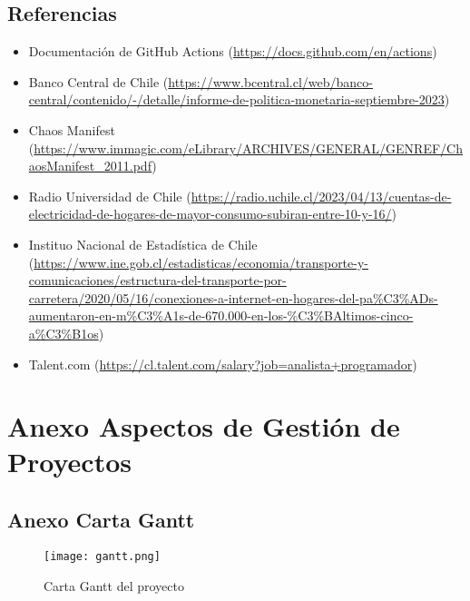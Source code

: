 \subsection{Referencias}
\begin{itemize}
  \item Documentación de GitHub Actions (\url{https://docs.github.com/en/actions})
  \item Banco Central de Chile (\url{https://www.bcentral.cl/web/banco-central/contenido/-/detalle/informe-de-politica-monetaria-septiembre-2023})
  \item Chaos Manifest (\url{https://www.immagic.com/eLibrary/ARCHIVES/GENERAL/GENREF/ChaosManifest\_2011.pdf})
  \item Radio Universidad de Chile (\url{https://radio.uchile.cl/2023/04/13/cuentas-de-electricidad-de-hogares-de-mayor-consumo-subiran-entre-10-y-16/})
  \item Instituo Nacional de Estadística de Chile (\url{https://www.ine.gob.cl/estadisticas/economia/transporte-y-comunicaciones/estructura-del-transporte-por-carretera/2020/05/16/conexiones-a-internet-en-hogares-del-pa\%C3\%ADs-aumentaron-en-m\%C3\%A1s-de-670.000-en-los-\%C3\%BAltimos-cinco-a\%C3\%B1os})
  \item Talent.com (\url{https://cl.talent.com/salary?job=analista+programador})
\end{itemize}

\section{Anexo Aspectos de Gestión de Proyectos}

\subsection{Anexo Carta Gantt}
\begin{figure}[H]
  \begin{center}
    \texttt{[image: gantt.png]}
  \end{center}
  \caption[Carta Gantt del proyecto]{Carta Gantt del proyecto}
  \label{fig:gantt}
\end{figure}

\newpage

